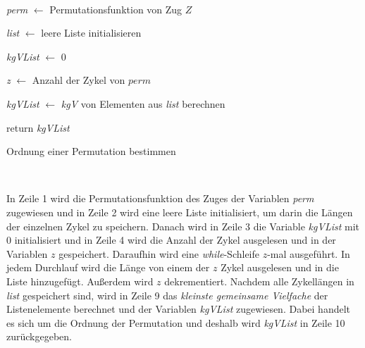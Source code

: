 \documentclass[12pt,a4paper, usenames, dvipsnames]{article}
\theoremstyle{mystyle}
\theoremstyle{definition}
\begin{document}
\begin{minipage}[H]{0.14\textwidth}
      $\ $
\end{minipage}
\begin{minipage}[H]{0.72\textwidth}
\begin{algorithm}[H]
\LinesNumbered
\DontPrintSemicolon
{}
\BlankLine
 \textit{perm} $\leftarrow$ Permutationsfunktion von Zug $Z$\;

  \textit{list} $\leftarrow$ leere Liste initialisieren\;
  
  \textit{kgVList} $\leftarrow$ 0 \;

  \textit{z} $\leftarrow$ Anzahl der Zykel von $perm$ \; 

  \textit{kgVList} $\leftarrow$ \textit{kgV} von Elementen aus \textit{list} berechnen \;

 return \textit{kgVList} \;

\caption{Ordnung einer Permutation bestimmen} 
\label{Algorithmus_OrdnungPermutation}
\end{algorithm}
\end{minipage}
\begin{minipage}[H]{0.14\textwidth}
      $\ $
\end{minipage}

\vspace*{1em}

In Zeile 1 wird die Permutationsfunktion des Zuges der Variablen \textit{perm} zugewiesen und in Zeile 2 wird eine leere Liste initialisiert, um darin die Längen der einzelnen Zykel zu speichern. Danach wird in Zeile 3 die Variable \textit{kgVList} mit 0 initialisiert und in Zeile 4 wird die Anzahl der Zykel ausgelesen und in der Variablen $z$ gespeichert. Daraufhin wird eine \textit{while}-Schleife $z$-mal ausgeführt. In jedem Durchlauf wird die Länge von einem der $z$ Zykel ausgelesen und in die Liste hinzugefügt. Außerdem wird $z$ dekrementiert. Nachdem alle Zykellängen in \textit{list} gespeichert sind, wird in Zeile 9 das \textit{kleinste gemeinsame Vielfache} der Listenelemente berechnet und der Variablen \textit{kgVList} zugewiesen. Dabei handelt es sich um die Ordnung der Permutation und deshalb wird \textit{kgVList} in Zeile 10 zurückgegeben.
\end{document}
